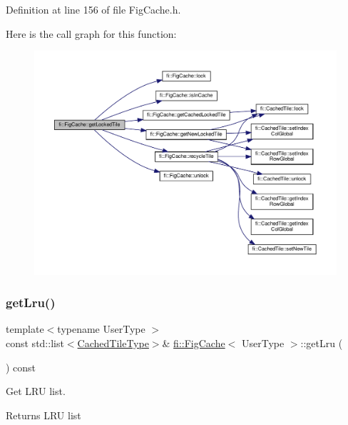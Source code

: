 Definition at line 156 of file Fig\+Cache.\+h.

Here is the call graph for this function\+:
\nopagebreak
\begin{figure}[H]
\begin{center}
\leavevmode
\includegraphics[width=350pt]{d7/d31/classfi_1_1FigCache_aff587e5ffcbeeab89a0ed4a0629231e3_cgraph}
\end{center}
\end{figure}
\mbox{\label{classfi_1_1FigCache_a91dafec92a6f09fa3aa46d85328a0a30}} 
\subsubsection{\texorpdfstring{get\+Lru()}{getLru()}}
{\footnotesize\ttfamily template$<$typename User\+Type $>$ \\
const std\+::list$<$\hyperlink{classfi_1_1FigCache_a7b9bbc4a832c01c3a461f573445c3c41}{Cached\+Tile\+Type}$>$\& \hyperlink{classfi_1_1FigCache}{fi\+::\+Fig\+Cache}$<$ User\+Type $>$\+::get\+Lru (\begin{DoxyParamCaption}{ }\end{DoxyParamCaption}) const\hspace{0.3cm}{\ttfamily [inline]}}



Get L\+RU list. 

\begin{DoxyReturn}{Returns}
L\+RU list 
\end{DoxyReturn}


